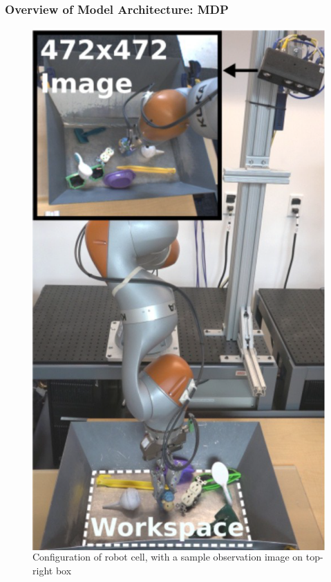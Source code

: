 \documentclass{beamer}
\newcommand{\thirdSec}{Overview of Model Architecture}
\begin{document}
    \begin{frame}
      \frametitle{\thirdSec: MDP}
      \begin{figure}
        \begin{columns}
            \centering
            \includegraphics[height=0.82\textheight]{Images/WorkspaceOverview.png}
            \caption{Configuration of robot cell, with a sample observation image on top-right box}
            \label{fig:WorkspaceOverview}
        \end{columns}
      \end{figure}
    \end{frame}
\end{document}
